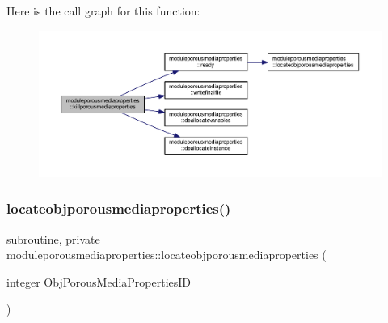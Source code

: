 Here is the call graph for this function\+:\nopagebreak
\begin{figure}[H]
\begin{center}
\leavevmode
\includegraphics[width=350pt]{namespacemoduleporousmediaproperties_a735090aa674c6c295828243dcd120d40_cgraph}
\end{center}
\end{figure}
\mbox{\label{namespacemoduleporousmediaproperties_a69bcc7ae1a4b78b640c2d9f0d660587f}} 
\subsubsection{\texorpdfstring{locateobjporousmediaproperties()}{locateobjporousmediaproperties()}}
{\footnotesize\ttfamily subroutine, private moduleporousmediaproperties\+::locateobjporousmediaproperties (\begin{DoxyParamCaption}\item[{integer}]{Obj\+Porous\+Media\+Properties\+ID }\end{DoxyParamCaption})\hspace{0.3cm}{\ttfamily [private]}}

